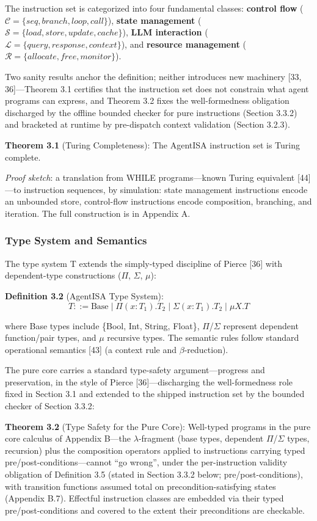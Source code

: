 \documentclass[
  sigconf,
  anonymous]{acmart}
\begin{document}
The instruction set is categorized into four fundamental classes:
\textbf{control flow} (\(\mathcal{C} = \{seq, branch, loop, call\}\)),
\textbf{state management}
(\(\mathcal{S} = \{load, store, update, cache\}\)), \textbf{LLM
interaction} (\(\mathcal{L} = \{query, response, context\}\)), and
\textbf{resource management}
(\(\mathcal{R} = \{allocate, free, monitor\}\)).

Two sanity results anchor the definition; neither introduces new
machinery {[}33, 36{]}---Theorem 3.1 certifies that the instruction set
does not constrain what agent programs can express, and Theorem 3.2
fixes the well-formedness obligation discharged by the offline bounded
checker for pure instructions (Section 3.3.2) and bracketed at runtime
by pre-dispatch context validation (Section 3.2.3).

\textbf{Theorem 3.1} (Turing Completeness): The AgentISA instruction set
is Turing complete.

\emph{Proof sketch}: a translation from WHILE programs---known Turing
equivalent {[}44{]}---to instruction sequences, by simulation: state
management instructions encode an unbounded store, control-flow
instructions encode composition, branching, and iteration. The full
construction is in Appendix A.

\subsubsection{Type System and
Semantics}\label{type-system-and-semantics}

The type system T extends the simply-typed discipline of Pierce {[}36{]}
with dependent-type constructions (\(\Pi\), \(\Sigma\), \(\mu\)):

\textbf{Definition 3.2} (AgentISA Type System): \[
T ::= \text{Base} \mid \Pi(x:T_1).T_2 \mid \Sigma(x:T_1).T_2 \mid \mu X.T
\]

where Base types include \{Bool, Int, String, Float\},
\(\Pi\)/\(\Sigma\) represent dependent function/pair types, and \(\mu\)
recursive types. The semantic rules follow standard operational
semantics {[}43{]} (a context rule and \(\beta\)-reduction).

The pure core carries a standard type-safety argument---progress and
preservation, in the style of Pierce {[}36{]}---discharging the
well-formedness role fixed in Section 3.1 and extended to the shipped
instruction set by the bounded checker of Section 3.3.2:

\textbf{Theorem 3.2} (Type Safety for the Pure Core): Well-typed
programs in the pure core calculus of Appendix B---the
\(\lambda\)-fragment (base types, dependent \(\Pi\)/\(\Sigma\) types,
recursion) plus the composition operators applied to instructions
carrying typed pre/post-conditions---cannot ``go wrong'', under the
per-instruction validity obligation of Definition 3.5 (stated in Section
3.3.2 below; pre/post-conditions), with transition functions assumed
total on precondition-satisfying states (Appendix B.7). Effectful
instruction classes are embedded via their typed pre/post-conditions and
covered to the extent their preconditions are checkable.
\end{document}
